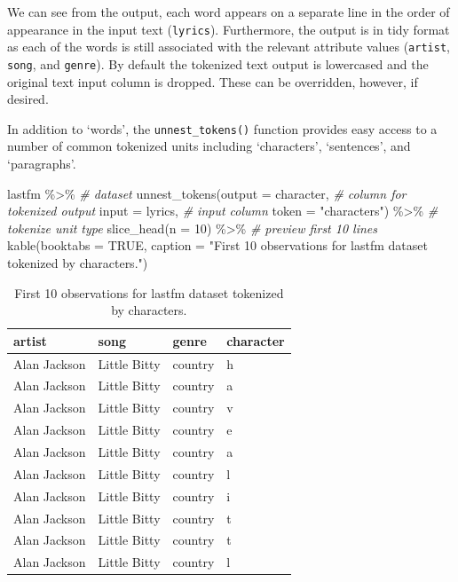 \documentclass[
]{article}
\newenvironment{Shaded}{\begin{snugshade}}{\end{snugshade}}
\newcommand{\AttributeTok}[1]{\textcolor[rgb]{0.77,0.63,0.00}{#1}}
\newcommand{\CommentTok}[1]{\textcolor[rgb]{0.56,0.35,0.01}{\textit{#1}}}
\newcommand{\ConstantTok}[1]{\textcolor[rgb]{0.00,0.00,0.00}{#1}}
\newcommand{\DecValTok}[1]{\textcolor[rgb]{0.00,0.00,0.81}{#1}}
\newcommand{\FunctionTok}[1]{\textcolor[rgb]{0.00,0.00,0.00}{#1}}
\newcommand{\NormalTok}[1]{#1}
\newcommand{\SpecialCharTok}[1]{\textcolor[rgb]{0.00,0.00,0.00}{#1}}
\newcommand{\StringTok}[1]{\textcolor[rgb]{0.31,0.60,0.02}{#1}}
\begin{document}
We can see from the output, each word appears on a separate line in the order of appearance in the input text (\texttt{lyrics}). Furthermore, the output is in tidy format as each of the words is still associated with the relevant attribute values (\texttt{artist}, \texttt{song}, and \texttt{genre}). By default the tokenized text output is lowercased and the original text input column is dropped. These can be overridden, however, if desired.

In addition to `words', the \texttt{unnest\_tokens()} function provides easy access to a number of common tokenized units including `characters', `sentences', and `paragraphs'.

\begin{Shaded}
\begin{Highlighting}[]
\NormalTok{lastfm }\SpecialCharTok{\%\textgreater{}\%} \CommentTok{\# dataset}
  \FunctionTok{unnest\_tokens}\NormalTok{(}\AttributeTok{output =}\NormalTok{ character, }\CommentTok{\# column for tokenized output}
                \AttributeTok{input =}\NormalTok{ lyrics, }\CommentTok{\# input column}
                \AttributeTok{token =} \StringTok{"characters"}\NormalTok{) }\SpecialCharTok{\%\textgreater{}\%} \CommentTok{\# tokenize unit type}
  \FunctionTok{slice\_head}\NormalTok{(}\AttributeTok{n =} \DecValTok{10}\NormalTok{) }\SpecialCharTok{\%\textgreater{}\%}  \CommentTok{\# preview first 10 lines}
  \FunctionTok{kable}\NormalTok{(}\AttributeTok{booktabs =} \ConstantTok{TRUE}\NormalTok{,}
        \AttributeTok{caption =} \StringTok{"First 10 observations for lastfm dataset tokenized by characters."}\NormalTok{)}
\end{Highlighting}
\end{Shaded}

\begin{table}

\caption{\label{tab:td-lastfm-tokenize-characters}First 10 observations for lastfm dataset tokenized by characters.}
\centering
\begin{tabular}[t]{llll}
\toprule
artist & song & genre & character\\
\midrule
Alan Jackson & Little Bitty & country & h\\
Alan Jackson & Little Bitty & country & a\\
Alan Jackson & Little Bitty & country & v\\
Alan Jackson & Little Bitty & country & e\\
Alan Jackson & Little Bitty & country & a\\
\addlinespace
Alan Jackson & Little Bitty & country & l\\
Alan Jackson & Little Bitty & country & i\\
Alan Jackson & Little Bitty & country & t\\
Alan Jackson & Little Bitty & country & t\\
Alan Jackson & Little Bitty & country & l\\
\bottomrule
\end{tabular}
\end{table}
\end{document}
